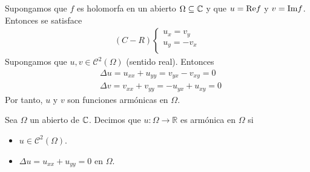 Supongamos que $f$ es holomorfa en un abierto $\Omega \subseteq \mathbb{C}$ y que $u = \text{Re} f$ y $v = \text{Im} f$. Entonces se satisface
\begin{align*}
    (C-R) \left\{ \begin{array}{lcc}
                      u_x = v_y  \\
                      u_y = -v_x \\
                  \end{array}
    \right.
\end{align*}
Supongamos que $u,v \in \mathcal{C}^2(\Omega)$ (sentido real). Entonces
\begin{align*}
     & \Delta u = u_{xx} + u_{yy} = v_{yx} - v_{xy} = 0  \\
     & \Delta v = v_{xx} + v_{yy} = -u_{yx} + u_{xy} = 0
\end{align*}
Por tanto, $u$ y $v$ son funciones armónicas en $\Omega$.

\begin{defi}
    Sea $\Omega$ un abierto de $\mathbb{C}$. Decimos que $u : \Omega \longrightarrow \mathbb{R}$ es armónica en $\Omega$ si
    \begin{itemize}
        \item $u \in \mathcal{C}^2(\Omega)$.
        \item $\Delta u = u_{xx} + u_{yy} = 0$ en $\Omega$.
    \end{itemize}
\end{defi}

